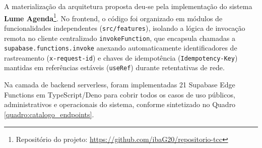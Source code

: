 \documentclass[12pt,a4paper]{article}
\begin{document}
A materialização da arquitetura proposta deu-se pela implementação do sistema \textbf{Lume Agenda}\footnote{Repositório do projeto: \url{https://github.com/ibaG20/repositorio-tcc}}. No frontend, o código foi organizado em módulos de funcionalidades independentes (\texttt{src/features}), isolando a lógica de invocação remota no cliente centralizado \texttt{invokeFunction}, que encapsula chamadas a \texttt{supabase.functions.invoke} anexando automaticamente identificadores de rastreamento (\texttt{x-request-id}) e chaves de idempotência (\texttt{Idempotency-Key}) mantidas em referências estáveis (\texttt{useRef}) durante retentativas de rede.

Na camada de backend serverless, foram implementadas 21 Supabase Edge Functions em TypeScript/Deno para cobrir todos os casos de uso públicos, administrativos e operacionais do sistema, conforme sintetizado no Quadro \ref{quadro:catalogo_endpoints}.
\end{document}

